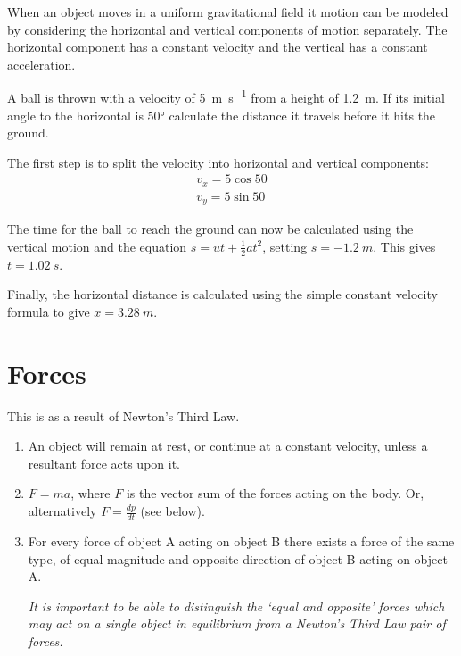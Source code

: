 \documentclass[revision-guide.tex]{subfiles}
\begin{document}
When an object moves in a uniform gravitational field it motion can be modeled by considering the horizontal and vertical components of motion separately. The horizontal component has a constant velocity and the vertical has a constant acceleration.

\begin{example}
A ball is thrown with a velocity of \SI{5}{m.s^{-1}} from a height of \SI{1.2}{m}. If its initial angle to the horizontal is \ang{50} calculate the distance it travels before it hits the ground.
\answer

The first step is to split the velocity into horizontal and vertical components:
	\begin{align*}
		v_x = 5\cos{50}\\
		v_y = 5\sin{50}
	\end{align*}

	The time for the ball to reach the ground can now be calculated using the vertical motion and the equation $s=ut+\frac{1}{2}at^2$, setting $s = \SI{-1.2}{m}$. This gives $t=\SI{1.02}{s}$.

	Finally, the horizontal distance is calculated using the simple constant velocity formula to give $x=\SI{3.28}{m}$.
\end{example}

\section{Forces}


This is as a result of Newton's Third Law.

\begin{enumerate}
	\item An object will remain at rest, or continue at a constant velocity, unless a resultant force acts upon it.
	\item $F=ma$, where $F$ is the vector sum of the forces acting on the body. Or, alternatively $F=\frac{dp}{dt}$ (see below).
	\item For every force of object A acting on object B there exists a force of the same type, of equal magnitude and opposite direction of object B acting on object A.

	\emph{It is important to be able to distinguish the `equal and opposite' forces which may act on a single object in equilibrium from a Newton's Third Law pair of forces.}
\end{enumerate}
\end{document}
